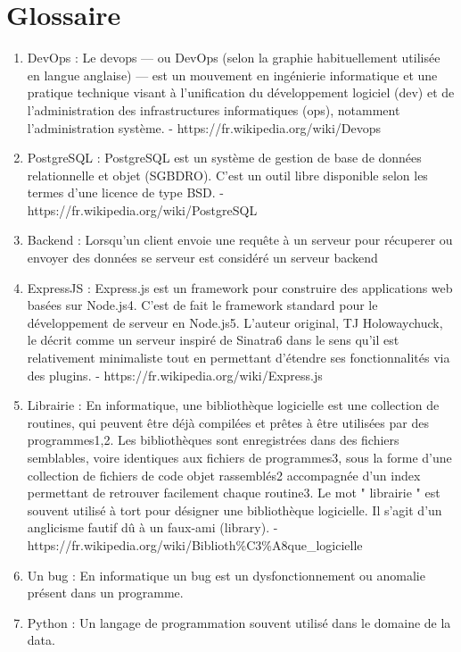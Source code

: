 \documentclass[12pt]{article}
\begin{document}
\begin {sloppypar}
\section{Glossaire}
\begin{enumerate}
  \item 
    DevOps : Le devops — ou DevOps (selon la graphie habituellement utilisée en langue anglaise) —
    est un mouvement en ingénierie informatique et une pratique technique visant à l'unification du développement logiciel (dev) et de l'administration des infrastructures informatiques (ops), notamment l'administration système. 
    - https://fr.wikipedia.org/wiki/Devops
  \item 
    PostgreSQL : PostgreSQL est un système de gestion de base de données relationnelle et objet (SGBDRO). C'est un outil libre disponible selon les termes d'une licence de type BSD. 
    - https://fr.wikipedia.org/wiki/PostgreSQL
  \item 
    Backend : Lorsqu'un client envoie une requête à un serveur pour récuperer ou envoyer des données se serveur est considéré un serveur backend
  \item 
    ExpressJS : Express.js est un framework pour construire des applications web basées sur Node.js4. C'est de fait le framework standard pour le développement de serveur en Node.js5. L'auteur original, TJ Holowaychuck, le décrit comme un serveur inspiré de Sinatra6 dans le sens qu'il est relativement minimaliste tout en permettant d'étendre ses fonctionnalités via des plugins. 
    - https://fr.wikipedia.org/wiki/Express.js
  \item 
    Librairie : En informatique, une bibliothèque logicielle est une collection de routines, qui peuvent être déjà compilées et prêtes à être utilisées par des programmes1,2.
    Les bibliothèques sont enregistrées dans des fichiers semblables, voire identiques aux fichiers de programmes3, sous la forme d'une collection de fichiers de code objet rassemblés2 accompagnée d'un index permettant de retrouver facilement chaque routine3. Le mot " librairie " est souvent utilisé à tort pour désigner une bibliothèque logicielle. Il s'agit d'un anglicisme fautif dû à un faux-ami (library). 
    - https://fr.wikipedia.org/wiki/Biblioth\%C3\%A8que\_logicielle
  \item 
    Un bug : En informatique un bug est un dysfonctionnement ou anomalie présent dans un programme. 
  \item 
    Python : Un langage de programmation souvent utilisé dans le domaine de la data. 

\end{enumerate}
\end{sloppypar}
\end{document}

